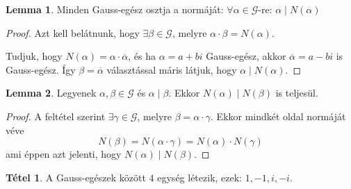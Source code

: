 \documentclass[12pt]{book}
\theoremstyle{plain} %
\theoremstyle{definition} %
\newtheorem{lem/}{Lemma}[section]
\newenvironment{lem}
  {\renewcommand{\qedsymbol}{$\clubsuit$}%
   \pushQED{\qed}\begin{lem/}}
  {\popQED\end{lem/}}
\newtheorem{theo/}{Tétel}[section]
\newenvironment{theo}
  {\renewcommand{\qedsymbol}{$\clubsuit$}%
   \pushQED{\qed}\begin{theo/}}
  {\popQED\end{theo/}}
\theoremstyle{remark}
\renewcommand\qedsymbol{$\blacksquare$}
\numberwithin{equation}{section}  %
\def\G{\mathcal{G}}
\begin{document}
	\begin{lem}\label{normoszt}
		Minden Gauss-egész osztja a normáját: $\forall \alpha \in \G$-re: $\alpha \mid N(\alpha)$
	\end{lem}

	\begin{proof}
		Azt kell belátnunk, hogy $\exists \beta \in \G$, melyre $\alpha \cdot \beta = N(\alpha)$.
		
		Tudjuk, hogy $N(\alpha)= \alpha\cdot \overline{\alpha}$, és ha $\alpha=a+bi$ Gauss-egész, akkor $\overline{\alpha}=a-bi$ is Gauss-egész. Így $\beta = \overline{\alpha}$ választással máris látjuk, hogy $\alpha\mid N(\alpha)$.
	\end{proof}

	\begin{lem}\label{normakoszt}
		Legyenek $\alpha,\beta\in \G$ és $\alpha \mid \beta$. Ekkor $N(\alpha)\mid N(\beta)$ is teljesül.
	\end{lem}
	
	\begin{proof}
		A feltétel szerint $\exists \gamma\in \G$, melyre $\beta = \alpha \cdot \gamma$. Ekkor mindkét oldal normáját véve
		\[ N(\beta) = N(\alpha\cdot \gamma) = N(\alpha)\cdot N(\gamma) \]
		ami éppen azt jelenti, hogy $N(\alpha)\mid N(\beta)$.
	\end{proof}
	
	\begin{theo}
		A Gauss-egészek között $4$ egység létezik, ezek: $1,-1,i,-i$.
	\end{theo} 
\end{document}
